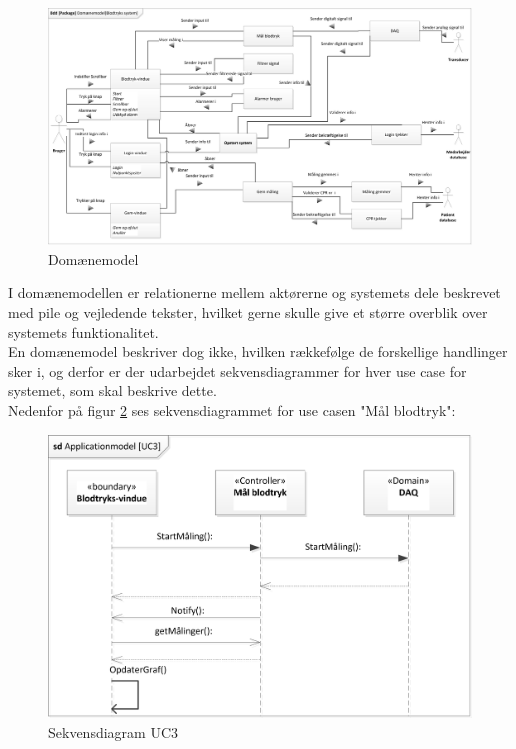  \begin{figure}[H]
	\centering
	\includegraphics[width=1\textwidth]{Figurer/ISE/Domaenemodel}
	\caption{Domænemodel}
	\label{domaenemodel}
\end{figure}

I domænemodellen er relationerne mellem aktørerne og systemets dele beskrevet med pile og vejledende tekster, hvilket gerne skulle give et større overblik over systemets funktionalitet. \\ 
En domænemodel beskriver dog ikke, hvilken rækkefølge de forskellige handlinger sker i, og derfor er der udarbejdet sekvensdiagrammer for hver use case for systemet, som skal beskrive dette.\\
Nedenfor på figur \ref{sekvensdiagram} ses sekvensdiagrammet for use casen "Mål blodtryk":

\begin{figure}[H]
	\centering
	\includegraphics[width=1\textwidth]{Figurer/ISE/sdAppModelUC3}
	\caption{Sekvensdiagram UC3}
	\label{sekvensdiagram}
\end{figure}

